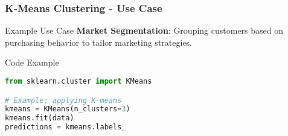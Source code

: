 \documentclass[aspectratio=169]{beamer}
\begin{document}
\begin{frame}[fragile]
    \frametitle{K-Means Clustering - Use Case}
    
    \begin{block}{Example Use Case}
        \textbf{Market Segmentation}: Grouping customers based on purchasing behavior to tailor marketing strategies.
    \end{block}
    
    \begin{block}{Code Example}
        \begin{lstlisting}[language=Python]
from sklearn.cluster import KMeans

# Example: applying K-means
kmeans = KMeans(n_clusters=3)
kmeans.fit(data)
predictions = kmeans.labels_
        \end{lstlisting}
    \end{block}
\end{frame}
\end{document}
